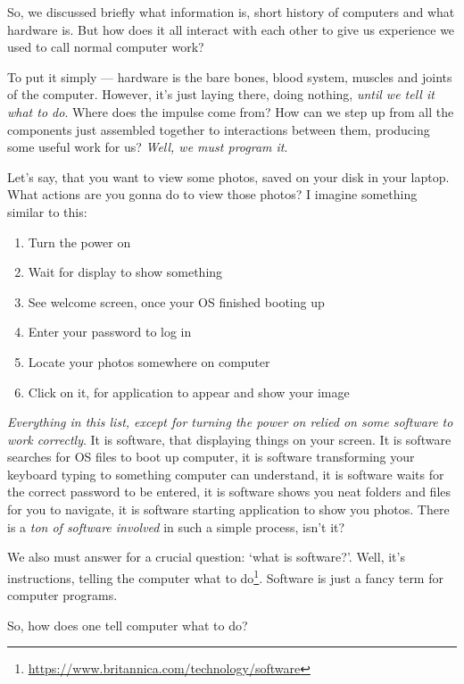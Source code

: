 \documentclass[../../why-computer.tex]{subfiles}
\begin{document}
    So, we discussed briefly what information is, short history of computers and what hardware is. But how does it all interact with each other to give us experience
    we used to call normal computer work? \par

    To put it simply --- hardware is the bare bones, blood system, muscles and joints of the computer. However, it's just laying there, doing nothing, \emph{until we tell it 
    what to do}. Where does the impulse come from? How can we step up from all the components just assembled together to interactions between them, producing some
    useful work for us? \emph{Well, we must program it}. \par

    Let's say, that you want to view some photos, saved on your disk in your laptop. What actions are you gonna do to view those photos? I imagine something similar to
    this: 

    \begin{enumerate}
        \item Turn the power on
        \item Wait for display to show something
        \item See welcome screen, once your OS finished booting up
        \item Enter your password to log in
        \item Locate your photos somewhere on computer
        \item Click on it, for application to appear and show your image
    \end{enumerate}

    \emph{Everything in this list, except for turning the power on relied on some software to work correctly}. It is software, that displaying things on your screen.
    It is software searches for OS files to boot up computer, it is software transforming your keyboard typing to something computer can understand, it is software
    waits for the correct password to be entered, it is software shows you neat folders and files for you to navigate, it is software starting application to show you
    photos. There is a \emph{ton of software involved} in such a simple process, isn't it? \par

    We also must answer for a crucial question: `what is software?'. Well, it's instructions, telling the computer what to do\footnote{\href{https://www.britannica.com/technology/software}
    {https://www.britannica.com/technology/software}}. Software is just a fancy term for computer programs. \par

    So, how does one tell computer what to do? 
\end{document}
